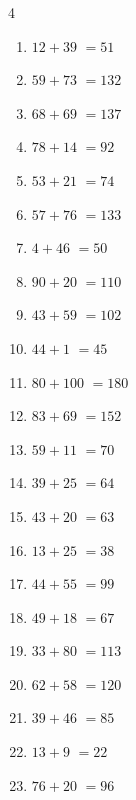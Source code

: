 \begin{multicols}{4}
\begin{enumerate}
  \item $12+39$
        $=51$

  \item $59+73$
        $=132$

  \item $68+69$
        $=137$

  \item $78+14$
        $=92$

  \item $53+21$
        $=74$

  \item $57+76$
        $=133$

  \item $4+46$
        $=50$

  \item $90+20$
        $=110$

  \item $43+59$
        $=102$

  \item $44+1$
        $=45$

  \item $80+100$
        $=180$

  \item $83+69$
        $=152$

  \item $59+11$
        $=70$

  \item $39+25$
        $=64$

  \item $43+20$
        $=63$

  \item $13+25$
        $=38$

  \item $44+55$
        $=99$

  \item $49+18$
        $=67$

  \item $33+80$
        $=113$

  \item $62+58$
        $=120$

  \item $39+46$
        $=85$

\columnbreak %

  \item $13+9$
        $=22$

  \item $76+20$
        $=96$


\end{enumerate}
\end{multicols}
